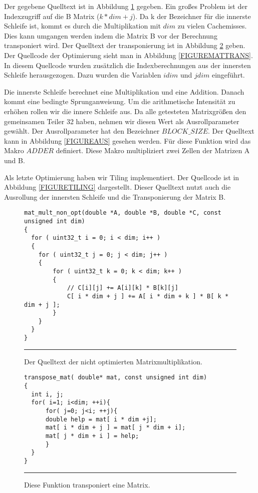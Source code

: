 Der gegebene Quelltext ist in Abbildung \ref{FIGUREORIGINAL} gegeben. Ein großes Problem ist der Indexzugriff auf die B Matrix ($k * dim + j$). Da k der Bezeichner für die innerste Schleife ist, kommt es durch die Multiplikation mit $dim$ zu vielen Cachemisses. Dies kann umgangen werden indem die Matrix B vor der Berechnung transponiert wird. Der Quelltext der transponierung ist in Abbildung \ref{FIGURETRANS} geben. Der Quellcode der Optimierung sieht man in Abbildung \ref{FIGUREMATTRANS}. In diesem Quellcode wurden zusätzlich die Indexberechnungen aus der innersten Schleife herausgezogen. Dazu wurden die Variablen $idim$ und $jdim$ eingeführt.

Die innerste Schleife berechnet eine Multiplikation und eine Addition. Danach kommt eine bedingte Sprunganweisung. Um die arithmetische Intensität zu erhöhen rollen wir die innere Schleife aus. Da alle getesteten Matrixgrößen den gemeinsamen Teiler 32 haben, nehmen wir diesen Wert als Ausrollparameter gewählt. Der Ausrollparameter hat den Bezeichner $BLOCK\_SIZE$. Der Quelltext kann in Abbildung \ref{FIGUREAUS} gesehen werden. Für diese Funktion wird das Makro $ADDER$ definiert. Diese Makro multipliziert zwei Zellen der Matrizen A und B. 

Als letzte Optimierung haben wir Tiling implementiert. Der Quellcode ist in Abbildung \ref{FIGURETILING} dargestellt. Dieser Quelltext nutzt auch die Ausrollung der innersten Schleife und die Transponierung der Matrix B. 



\lstset{language=c}
\begin{figure}[h]
\begin{lstlisting}
mat_mult_non_opt(double *A, double *B, double *C, const unsigned int dim)
{
  for ( uint32_t i = 0; i < dim; i++ )
  {
    for ( uint32_t j = 0; j < dim; j++ )
    {
        for ( uint32_t k = 0; k < dim; k++ )
        {
            // C[i][j] += A[i][k] * B[k][j]
            C[ i * dim + j ] += A[ i * dim + k ] * B[ k * dim + j ];    
        }
    }
  }
}
\end{lstlisting}
\captionsetup[figure]{skip=10pt}
\caption{Der Quelltext der nicht optimierten Matrixmultiplikation.}
\noindent\rule{14cm}{0.4pt}
\label{FIGUREORIGINAL}
\end{figure}

\lstset{language=c}
\begin{figure}[h]
 
\begin{lstlisting}
transpose_mat( double* mat, const unsigned int dim)
{
  int i, j;
  for( i=1; i<dim; ++i){
      for( j=0; j<i; ++j){
	  double help = mat[ i * dim +j];
	  mat[ i * dim + j ] = mat[ j * dim + i];
	  mat[ j * dim + i ] = help;
      }
  }
}
\end{lstlisting}
\caption{Diese Funktion transponiert eine Matrix.}
\noindent\rule{14cm}{0.4pt}
\label{FIGURETRANS}
\end{figure}


